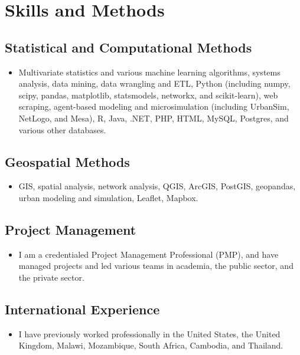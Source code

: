 \documentclass{academiccv}
\begin{document}
\section*{Skills and Methods}

\subsection*{Statistical and Computational Methods}

\begin{itemize}
\item Multivariate statistics and various machine learning algorithms, systems analysis, data mining, data wrangling and ETL, Python (including numpy, scipy, pandas, matplotlib, statsmodels, networkx, and scikit-learn), web scraping, agent-based modeling and microsimulation (including UrbanSim, NetLogo, and Mesa), R, Java, .NET, PHP, HTML, MySQL, Postgres, and various other databases.
\end{itemize}

\subsection*{Geospatial Methods}

\begin{itemize}
\item GIS, spatial analysis, network analysis, QGIS, ArcGIS, PostGIS, geopandas, urban modeling and simulation, Leaflet, Mapbox.
\end{itemize}

\subsection*{Project Management}

\begin{itemize}
\item I am a credentialed Project Management Professional (PMP), and have managed projects and led various teams in academia, the public sector, and the private sector.
\end{itemize}

\subsection*{International Experience}

\begin{itemize}
\item I have previously worked professionally in the United States, the United Kingdom, Malawi, Mozambique, South Africa, Cambodia, and Thailand.
\end{itemize}
\end{document}
